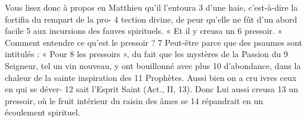 Vous lisez donc à propos en Matthieu qu'il l'entoura	 
3	 	d'une haie, c'est-à-dire la fortifia du rempart de la pro-	 
4	 	tection divine, de peur qu'elle ne fût d'un abord facile	 
5	 	aux incursions des fauves spirituels. « Et il y creusa un	 
6	 	pressoir. » Comment entendre ce qu'est le pressoir ?	 
7	 	Peut-être parce que des psaumes sont intitulés : « Pour	 
8	 	les pressoirs », du fait que les mystères de la Passion du	 
9	 	Seigneur, tel un vin nouveau, y ont bouillonné avec plus	 
10	 	d'abondance, dans la chaleur de la sainte inspiration des	 
11	 	Prophètes. Aussi bien on a cru ivres ceux en qui se déver-	 
12	 	sait l'Esprit Saint (Act., II, 13). Donc Lui aussi creusa	 
13	 	un pressoir, où le fruit intérieur du raisin des âmes se	 
14	 	répandrait en un écoulement spirituel.